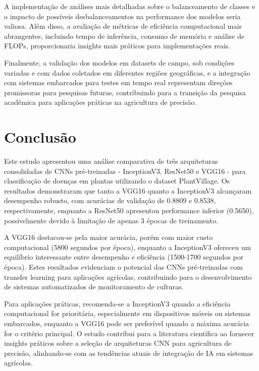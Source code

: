 \documentclass[12pt]{article}
\begin{document}
A implementação de análises mais detalhadas sobre o balanceamento de classes e o impacto de possíveis desbalanceamentos na performance dos modelos seria valiosa. Além disso, a avaliação de métricas de eficiência computacional mais abrangentes, incluindo tempo de inferência, consumo de memória e análise de FLOPs, proporcionaria insights mais práticos para implementações reais.

Finalmente, a validação dos modelos em datasets de campo, sob condições variadas e com dados coletados em diferentes regiões geográficas, e a integração com sistemas embarcados para testes em tempo real representam direções promissoras para pesquisas futuras, contribuindo para a transição da pesquisa acadêmica para aplicações práticas na agricultura de precisão.

\section{Conclusão}
Este estudo apresentou uma análise comparativa de três arquiteturas consolidadas de CNNs pré-treinadas - InceptionV3, ResNet50 e VGG16 - para classificação de doenças em plantas utilizando o dataset PlantVillage. Os resultados demonstraram que tanto a VGG16 quanto a InceptionV3 alcançaram desempenho robusto, com acurácias de validação de 0.8809 e 0.8538, respectivamente, enquanto a ResNet50 apresentou performance inferior (0.5650), possivelmente devido à limitação de apenas 3 épocas de treinamento.

A VGG16 destacou-se pela maior acurácia, porém com maior custo computacional (5800 segundos por época), enquanto a InceptionV3 ofereceu um equilíbrio interessante entre desempenho e eficiência (1500-1700 segundos por época). Estes resultados evidenciam o potencial das CNNs pré-treinadas com transfer learning para aplicações agrícolas, contribuindo para o desenvolvimento de sistemas automatizados de monitoramento de culturas.

Para aplicações práticas, recomenda-se a InceptionV3 quando a eficiência computacional for prioritária, especialmente em dispositivos móveis ou sistemas embarcados, enquanto a VGG16 pode ser preferível quando a máxima acurácia for o critério principal. O estudo contribui para a literatura científica ao fornecer insights práticos sobre a seleção de arquiteturas CNN para agricultura de precisão, alinhando-se com as tendências atuais de integração de IA em sistemas agrícolas.



\end{document}
